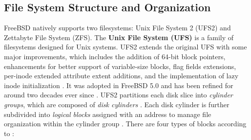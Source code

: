 \subsection{File System Structure and Organization} \label{file-structure-and-hierarchy} %

FreeBSD natively supports two filesystems: Unix File System 2 (UFS2) and Zettabyte File System (ZFS).
The \textbf{Unix File System (UFS)} is a family of filesystems designed for Unix systems. UFS2 extends the original UFS
with some major improvements, which includes the addition of 64-bit block pointers, enhancements for better support of
variable-size blocks, flag fields extensions, per-inode extended attribute extent additions, and the implementation
of lazy inode initialization \parencite{van_gelderen2003}. It was adopted in FreeBSD 5.0 and has been refined for around
two decades ever since \parencite{freebsd_zfs_vs_ufs}. UFS2 partitions each disk slice into \textit{cylinder groups},
which are composed of \textit{disk cylinders} \parencite{oracle2010}. Each disk cylinder is further subdivided into
\textit{logical blocks} assigned with an address to manage file organization within the cylinder group \parencite{oracle2010}.
There are four types of blocks according to \textcite{oracle2010}:

